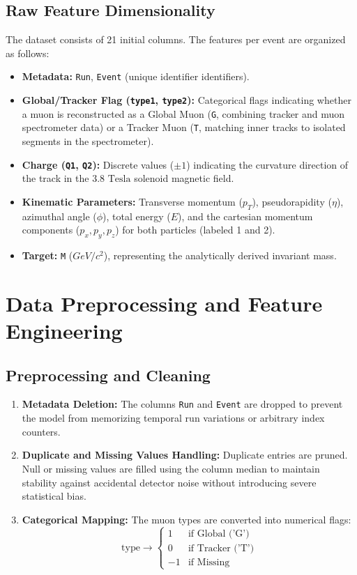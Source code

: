 \documentclass[11pt,a4paper]{article}
\begin{document}
\subsection{Raw Feature Dimensionality}

The dataset consists of 21 initial columns. The features per event are organized as follows:
\begin{itemize}
    \item \textbf{Metadata:} \texttt{Run}, \texttt{Event} (unique identifier identifiers).
    \item \textbf{Global/Tracker Flag (\texttt{type1}, \texttt{type2}):} Categorical flags indicating whether a muon is reconstructed as a Global Muon (\texttt{G}, combining tracker and muon spectrometer data) or a Tracker Muon (\texttt{T}, matching inner tracks to isolated segments in the spectrometer).
    \item \textbf{Charge (\texttt{Q1}, \texttt{Q2}):} Discrete values ($\pm 1$) indicating the curvature direction of the track in the $3.8\text{ Tesla}$ solenoid magnetic field.
    \item \textbf{Kinematic Parameters:} Transverse momentum ($p_T$), pseudorapidity ($\eta$), azimuthal angle ($\phi$), total energy ($E$), and the cartesian momentum components ($p_x, p_y, p_z$) for both particles (labeled 1 and 2).
    \item \textbf{Target:} \texttt{M} ($GeV/c^2$), representing the analytically derived invariant mass.
\end{itemize}

\section{Data Preprocessing and Feature Engineering}

\subsection{Preprocessing and Cleaning}

\begin{enumerate}
    \item \textbf{Metadata Deletion:} The columns \texttt{Run} and \texttt{Event} are dropped to prevent the model from memorizing temporal run variations or arbitrary index counters.
    \item \textbf{Duplicate and Missing Values Handling:} Duplicate entries are pruned. Null or missing values are filled using the column median to maintain stability against accidental detector noise without introducing severe statistical bias.
    \item \textbf{Categorical Mapping:} The muon types are converted into numerical flags:
    \begin{equation}
    \text{type} \longrightarrow \begin{cases} 1 & \text{if } \text{Global ('G')} \\ 0 & \text{if } \text{Tracker ('T')} \\ -1 & \text{if } \text{Missing} \end{cases}
    \end{equation}
\end{enumerate}
\end{document}
